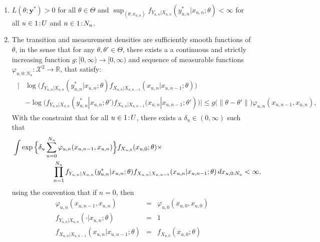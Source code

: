   \begin{enumerate}
    \item $L(\theta; \mathbf{y}^*) > 0$ for all $\theta \in \Theta$ and $\sup_{(\theta, x_{u, n})}f_{Y_{u, n}|X_{u, n}}(y^*_{u, n}|x_{u,n}; \theta) < \infty$ for all $u \in {1}\!:\!{U}$ and $n \in {1}\!:\!{N_u}$. \label{assumption:1}
    \item The transition and measurement densities are sufficiently smooth functions of $\theta$, in the sense that for any $\theta, \theta' \in \Theta$, there exists a a continuous and strictly increasing function $g: [0, \infty) \rightarrow [0, \infty)$ and sequence of measurable functions $\varphi_{u, 0:N_u}: \mathcal{X}^2 \rightarrow \mathbb{R}$, that satisfy:
    \begin{align*}
    \begin{split}
    |&\log\big(f_{Y_{u, n}|X_{u, n}}(y^*_{u, n}|x_{u, n};\theta)f_{X_{u, n}|X_{u, n-1}}(x_{u, n}|x_{u, n-1};\theta)\big) \\
    & - \log\big(f_{Y_{u, n}|X_{u, n}}(y^*_{u, n}|x_{u, n};\theta')f_{X_{u, n}|X_{u, n-1}}(x_{u, n}|x_{u, n-1};\theta')\big)| \leq g\big(\|\theta - \theta'\|\big)\varphi_{u, n}(x_{u, n-1}, x_{u, n}),
    \end{split}
    \end{align*}
    With the constraint that for all $u\in {1}\!:\!{U}$, there exists a $\delta_u \in (0, \infty)$ such that
    \begin{align*}
    &  \int \exp\Big\{\delta_u \sum_{n = 0}^{N_u}\varphi_{u, n}(x_{u, n-1}, x_{u, n})\Big\} f_{X_{u, 0}}(x_{u, 0};\theta) \times
    \\
    & \hspace{20mm} \prod_{n = 1}^{N_u}f_{Y_{u, n}|X_{u, n}}(y^*_{u, n}|x_{u, n};\theta)f_{X_{u, n}|X_{u, n-1}}(x_{u, n}|x_{u, n-1};\theta)\, dx_{u, 0:N_u} < \infty,
    \end{align*}
    using the convention that if $n=0$, then
    \begin{eqnarray*}
      \varphi_{u, n}(x_{u, n-1}, x_{u, n}) &=& \varphi_{u, 0}(x_{u, 0}, x_{u, 0})
      \\
      f_{Y_{u, n}|X_{u, n}}(\cdot | x_{u, n}; \theta) &=& 1
      \\
      f_{X_{u, n} | X_{u, n-1}}(x_{u, n}|x_{u, n-1};\theta) &=& f_{X_{u, 0}}(x_{u, 0}; \theta)
    \end{eqnarray*}
    \label{assumption:2}
    

\end{enumerate}
